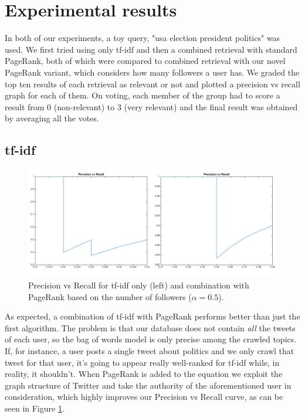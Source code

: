 \section{Experimental results}

In both of our experiments, a toy query, "usa election president politics" was
used. We first tried using only tf-idf and then a combined retrieval with
standard PageRank, both of which were compared to combined retrieval with our
novel PageRank variant, which considers how many followers a user has. We graded
the top ten results of each retrieval as relevant or not and plotted a precision
vs recall graph for each of them. On voting, each member of the group had to score
a result from 0 (non-relevant) to 3 (very relevant) and the final result was obtained
by averaging all the votes.

\subsection{tf-idf}

\begin{figure}[H]
\centering
\includegraphics[width=5.5in,natwidth=534,natheight=345]{images/exptfidf.png}
\caption{Precision vs Recall for tf-idf only (left) and combination with PageRank based on the number of followers ($\alpha = 0.5$).}
\label{fig:exptfidf}
\end{figure}

As expected, a combination of tf-idf with PageRank performs better than just the
first algorithm.  The problem is that our database does not contain \emph{all}
the tweets of each user, so the bag of words model is only precise among the
crawled topics. If, for instance, a user posts a single tweet about politics and
we only crawl that tweet for that user, it's going to appear really well-ranked
for tf-idf while, in reality, it shouldn't. When PageRank is added to the
equation we exploit the graph structure of Twitter and take the authority of the
aforementioned user in consideration, which highly improves our Precision vs
Recall curve, as can be seen in Figure \ref{fig:exptfidf}.

